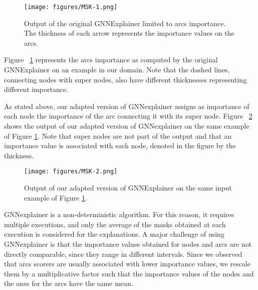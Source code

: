 \begin{figure}
    \centering
    \texttt{[image: figures/MSK-1.png]}
    \caption[How explainer algorithm works]{Output of the original GNNExplainer limited to arcs importance. The thickness of each arrow represents the importance values on the arcs.}
    \label{fig:MSK-1}
\end{figure}

Figure ~\ref{fig:MSK-1} represents the arcs importance as computed by the original GNNExplainer on an example in our domain. Note that the dashed lines, connecting nodes with super nodes, also have different thicknesses representing different importance.



As stated above, our adapted version of GNNexplainer assigns as importance of each node the importance of the arc connecting it with its super node.
Figure ~\ref{fig:EX4} shows the output of our adapted version of GNNexplainer on the same example of Figure \ref{fig:MSK-1}. Note that super nodes are not part of the output and that an importance value is associated with each node, denoted in the figure by the thickness.


\begin{figure}
    \centering
    \texttt{[image: figures/MSK-2.png]}
    \caption[How to obtain a node mask]{Output of our adapted version of GNNExplainer on the same input example of Figure \ref{fig:MSK-1}.}
    \label{fig:EX4}
\end{figure}

GNNexplainer is a non-deterministic algorithm. For this reason, it requires multiple executions, and only the average of the masks obtained at each execution is considered for the explanations.
A major challenge of using GNNexplainer is that the importance values obtained for nodes and arcs are not directly comparable, since they range in different intervals. 
Since we observed that arcs scorers are usually associated with lower importance values, we rescale them by a multiplicative factor such that the importance values of the nodes and the ones for the arcs have the same mean.

